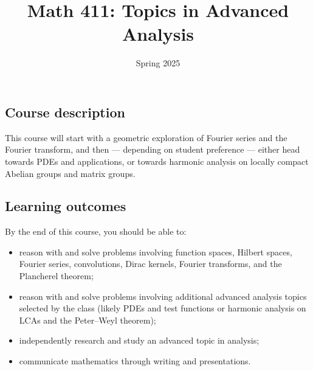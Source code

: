 \documentclass[11pt,twoside]{amsart}
\title{Math 411: Topics in Advanced Analysis}
\author[Math 411: Topics in Advanced Analysis]{Spring 2025}
\begin{document}
\maketitle


\begin{center}
\end{center}

\smallskip

\subsection*{Course description}
This course will start with a geometric exploration of Fourier series and the Fourier transform, and then --- depending on student preference --- either head towards PDEs and applications, or towards harmonic analysis on locally compact Abelian groups and matrix groups.

\subsection*{Learning outcomes}
By the end of this course, you should be able to:
\begin{itemize}
\item reason with and solve problems involving function spaces, Hilbert spaces, Fourier series, convolutions, Dirac kernels, Fourier transforms, and the Plancherel theorem;
\item reason with and solve problems involving additional advanced analysis topics selected by the class (likely PDEs and test functions or harmonic analysis on LCAs and the Peter--Weyl theorem);
\item independently research and study an advanced topic in analysis;
\item communicate mathematics through writing and presentations.
\end{itemize}
\end{document}
